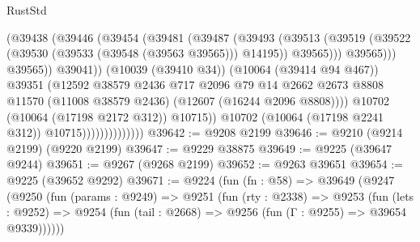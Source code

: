 \begin{lexlean}{RustStd}
\begin{coremodule}
                                          (@39438
                                            (@39446
                                              (@39454
                                                (@39481
                                                  (@39487
                                                    (@39493
                                                      (@39513
                                                        (@39519
                                                          (@39522
                                                            (@39530
                                                              (@39533 (@39548 (@39563 @39565)))
                                                              @14195))
                                                          @39565)))
                                                    @39565)))
                                              @39565))
                                          @39041))
                                      (@10039 (@39410 @34))
                                      (@10064 (@39414 @94 @467))
                                      @39351
                                      (@12592
                                        @38579
                                        @2436
                                        @717
                                        @2096
                                        @79
                                        @14
                                        @2662
                                        @2673
                                        @8808
                                        @11570
                                        (@11008 @38579 @2436)
                                        (@12607 (@16244 @2096 @8808))))
                                    @10702
                                    (@10064 (@17198 @2172 @312))
                                    @10715))
                                @10702
                                (@10064 (@17198 @2241 @312))
                                @10715))))))))))))))
@39642 := @9208 @2199
@39646 := @9210 (@9214 @2199) (@9220 @2199)
@39647 := @9229 @38875
@39649 := @9225 (@39647 @9244)
@39651 := @9267 (@9268 @2199)
@39652 := @9263 @39651
@39654 := @9225 (@39652 @9292)
@39671 := @9224
    (fun (fn : @58) =>
    @39649
      (@9247
        (@9250
          (fun (params : @9249) =>
          @9251
            (fun (rty : @2338) =>
            @9253
              (fun (lets : @9252) =>
              @9254 (fun (tail : @2668) => @9256 (fun (Γ : @9255) => @39654 @9339))))))

\end{coremodule}
\end{lexlean}
